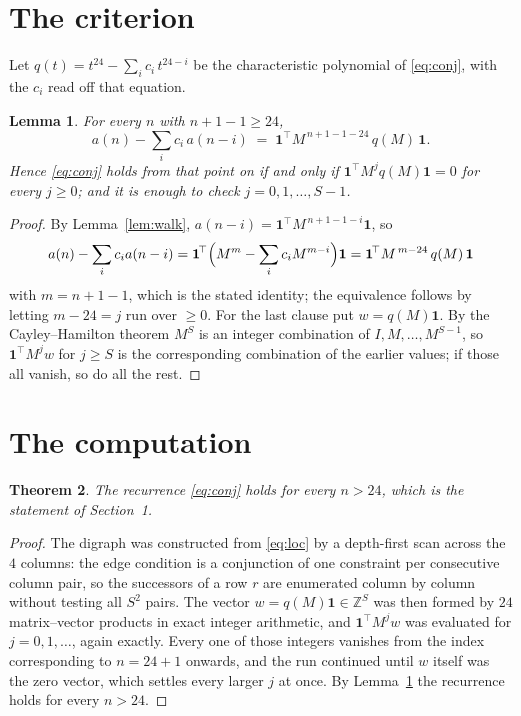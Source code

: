 \documentclass[11pt,a4paper]{article}
\theoremstyle{plain}
\newtheorem{theorem}{Theorem}
\newtheorem{lemma}[theorem]{Lemma}
\theoremstyle{definition}
\begin{document}
\section{The criterion}

Let $q(t)=t^{24}-\sum_i c_i\,t^{24-i}$ be the characteristic polynomial of
\eqref{eq:conj}, with the $c_i$ read off that equation.

\begin{lemma}\label{lem:crit}
For every $n$ with $n+1-1\ge24$,
\[
a(n)-\sum_i c_i\,a(n-i)\;=\;\mathbf{1}^{\!\top}M^{\,n+1-1-24}\,q(M)\,\mathbf{1} .
\]
Hence \eqref{eq:conj} holds from that point on if and only if
$\mathbf{1}^{\!\top}M^{j}q(M)\mathbf{1}=0$ for every $j\ge0$; and it is enough to check
$j=0,1,\dots,S-1$.
\end{lemma}

\begin{proof}
By Lemma~\ref{lem:walk}, $a(n-i)=\mathbf{1}^{\!\top}M^{\,n+1-1-i}\mathbf{1}$, so
\[
a(n)-\sum_i c_i a(n-i)
=\mathbf{1}^{\!\top}\Bigl(M^{m}-\sum_i c_i M^{m-i}\Bigr)\mathbf{1}
=\mathbf{1}^{\!\top}M^{\,m-24}\,q(M)\,\mathbf{1}
\]
with $m=n+1-1$, which is the stated identity; the equivalence follows by letting
$m-24=j$ run over $\ge0$. For the last clause put $w=q(M)\mathbf{1}$. By the
Cayley--Hamilton theorem $M^{S}$ is an integer combination of $I,M,\dots,M^{S-1}$, so
$\mathbf{1}^{\!\top}M^{j}w$ for $j\ge S$ is the corresponding combination of the earlier
values; if those all vanish, so do all the rest.
\end{proof}

\section{The computation}

\begin{theorem}
The recurrence \eqref{eq:conj} holds for every $n>24$, which is the statement of
Section~1.
\end{theorem}

\begin{proof}
The digraph was constructed from \eqref{eq:loc} by a depth-first scan across the $4$
columns: the edge condition is a conjunction of one constraint per consecutive column
pair, so the successors of a row $r$ are enumerated column by column without testing all
$S^2$ pairs. The vector $w=q(M)\mathbf{1}\in\mathbb{Z}^{S}$ was then formed by $24$
matrix--vector products in exact integer arithmetic, and $\mathbf{1}^{\!\top}M^{j}w$ was
evaluated for $j=0,1,\dots$, again exactly. Every one of those integers vanishes from the
index corresponding to $n=24+1$ onwards, and the run continued until $w$ itself was the
zero vector, which settles every larger $j$ at once. By Lemma~\ref{lem:crit} the recurrence
holds for every $n>24$.
\end{proof}
\end{document}
